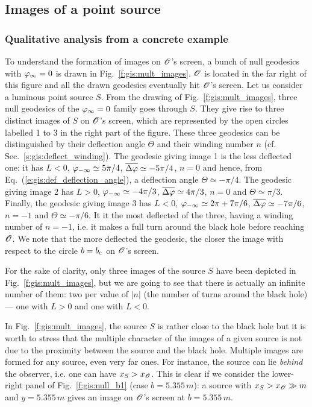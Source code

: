 \subsection{Images of a point source} \label{s:gis:images_point}


\subsubsection{Qualitative analysis from a concrete example}

To understand the formation of images on $\mathscr{O}$'s screen, a bunch of null
geodesics with $\varphi_\infty=0$ is drawn in Fig.~\ref{f:gis:mult_images}.
$\mathscr{O}$ is located in the far right of this figure and
all the drawn geodesics eventually hit $\mathscr{O}$'s screen. Let us consider a luminous point source
$S$. From the drawing of Fig.~\ref{f:gis:mult_images},
three null geodesics of the $\varphi_\infty=0$ family goes through $S$. They give rise to
three distinct images of $S$ on $\mathscr{O}$'s screen, which are represented by the
open circles labelled 1 to 3 in the right part of the figure. These three
geodesics can be distinguished by their deflection angle $\Theta$
and their winding number $n$ (cf. Sec.~\ref{s:gis:deflect_winding}).
The geodesic giving image 1 is the less deflected one: it has $L<0$,
$\varphi_{-\infty}\simeq 5\pi/4$, $\overline{\Delta\varphi} \simeq -5\pi/4$, $n=0$ and hence, from
Eq.~(\ref{e:gis:def_deflection_angle}), a deflection angle
$\Theta \simeq -\pi/4$.
The geodesic giving image 2 has $L>0$, $\varphi_{-\infty}\simeq -4\pi/3$,
$\overline{\Delta\varphi} \simeq 4\pi/3$, $n=0$ and $\Theta\simeq \pi/3$.
Finally, the geodesic giving image 3 has $L<0$, $\varphi_{-\infty}\simeq2\pi + 7\pi/6$,
$\overline{\Delta\varphi} \simeq -7\pi/6$, $n=-1$ and $\Theta\simeq -\pi/6$.
It it the most deflected of the three, having a winding number of $n=-1$, i.e. it makes a full turn around
the black hole before reaching $\mathscr{O}$.
We note that the more deflected the geodesic,
the closer the image with respect to the circle $b = b_{\rm c}$ on $\mathscr{O}$'s
screen.

For the sake of clarity, only three images of the source $S$ have been
depicted in Fig.~\ref{f:gis:mult_images}, but we are going to see
that there is actually an infinite
number of them: two per value of $|n|$ (the number of turns around the black hole)
--- one with $L>0$ and one with $L<0$.

\begin{remark}
In Fig.~\ref{f:gis:mult_images}, the source $S$ is rather close to the
black hole but it is worth to stress that
the multiple character of the images of a given
source is not due to the proximity between the source and the black hole.
Multiple images are formed for any source, even very far ones.
For instance, the source can lie \emph{behind} the
observer, i.e. one can have $x_S > x_{\mathscr{O}}$. This is clear if we consider
the lower-right panel of Fig.~\ref{f:gis:null_b1} (case $b=5.355\, m$):
a source with $x_S > x_{\mathscr{O}} \gg m$ and $y=5.355\, m$ gives an image on
$\mathscr{O}$'s screen at $b=5.355\, m$.
\end{remark}


